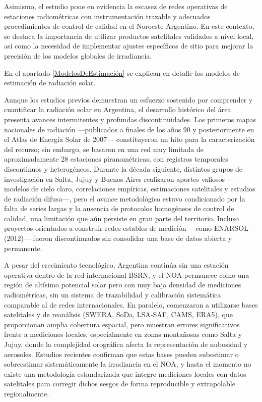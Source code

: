 \documentclass[letterpaper,12pt, twoside]{report}
\providecommand{\DIFdeltex}[1]{{\protect\color{red} \scriptsize #1}} %
\providecommand{\DIFdel}[1]{\texorpdfstring{\DIFdeltex{#1}}{}} %
\begin{document}
\DIFdel{Asimismo, el estudio pone en evidencia la escasez de redes operativas de estaciones radiométricas con instrumentación trazable y adecuados procedimientos de control de calidad en el Noroeste Argentino. En este contexto, se destaca la importancia de utilizar productos satelitales validados a nivel local, así como la necesidad de implementar ajustes específicos de sitio para mejorar la precisión de los modelos globales de irradiancia.}%

\DIFdel{En el apartado \ref{ModelosDeEstimación} se explican en detalle los modelos de estimación de radiación solar.}%

\DIFdel{Aunque los estudios previos demuestran un esfuerzo sostenido por comprender y cuantificar la radiación solar en Argentina, el desarrollo histórico del área presenta avances intermitentes y profundas discontinuidades. Los primeros mapas nacionales de radiación —publicados a finales de los años 90 y posteriormente en el Atlas de Energía Solar de 2007— constituyeron un hito para la caracterización del recurso; sin embargo, se basaron en una red muy limitada de aproximadamente 28 estaciones piranométricas, con registros temporales discontinuos y heterogéneos. Durante la década siguiente, distintos grupos de investigación en Salta, Jujuy y Buenos Aires realizaron aportes valiosos —modelos de cielo claro, correlaciones empíricas, estimaciones satelitales y estudios de radiación difusa—, pero el avance metodológico estuvo condicionado por la falta de series largas y la ausencia de protocolos homogéneos de control de calidad, una limitación que aún persiste en gran parte del territorio. Incluso proyectos orientados a construir redes estables de medición —como ENARSOL (2012)— fueron discontinuados sin consolidar una base de datos abierta y permanente.
}%

\DIFdel{A pesar del crecimiento tecnológico, Argentina continúa sin una estación operativa dentro de la red internacional BSRN, y el NOA permanece como una región de altísimo potencial solar pero con muy baja densidad de mediciones radiométricas, sin un sistema de trazabilidad y calibración sistemática comparable al de redes internacionales. En paralelo, comenzaron a utilizarse bases satelitales y de reanálisis (SWERA, SoDa, LSA-SAF, CAMS, ERA5), que proporcionan amplia cobertura espacial, pero muestran errores significativos frente a mediciones locales, especialmente en zonas montañosas como Salta y Jujuy, donde la complejidad orográfica afecta la representación de nubosidad y aerosoles. Estudios recientes confirman que estas bases pueden subestimar o sobreestimar sistemáticamente la irradiancia en el NOA, y hasta el momento no existe una metodología estandarizada que integre mediciones locales con datos satelitales para corregir dichos sesgos de forma reproducible y extrapolable regionalmente.
}%
\end{document}
